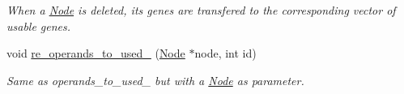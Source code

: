 \begin{DoxyCompactItemize}
\begin{DoxyCompactList}\small\item\em When a \hyperlink{classNode}{Node} is deleted, its genes are transfered to the corresponding vector of usable genes. \end{DoxyCompactList}\item 
\mbox{\label{classEvolution_a6fbea5d647dc45271386d75636deecba}} 
void \hyperlink{classEvolution_a6fbea5d647dc45271386d75636deecba}{re\+\_\+operands\+\_\+to\+\_\+used\+\_\+} (\hyperlink{classNode}{Node} $\ast$node, int id)
\begin{DoxyCompactList}\small\item\em Same as operands\+\_\+to\+\_\+used\+\_\+ but with a \hyperlink{classNode}{Node} as parameter. \end{DoxyCompactList}\end{DoxyCompactItemize}
